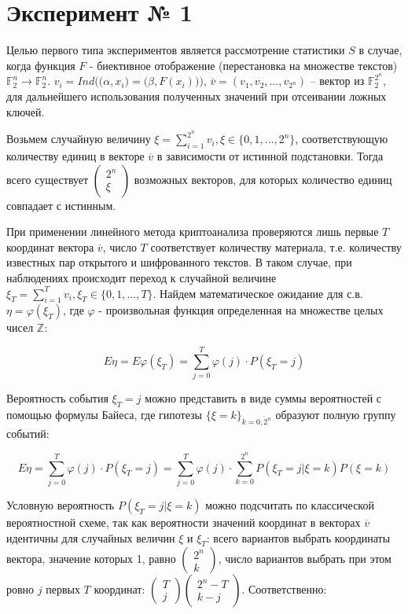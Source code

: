 \documentclass[utf8x, 14pt]{G7-32} %
\begin{document}
\section{Эксперимент № 1}
Целью первого типа экспериментов является рассмотрение статистики $S$ в случае, когда функция $F$ - биективное отображение (перестановка на множестве текстов) $\mathbb{F}_2^n \to \mathbb{F}_2^n$. $v_i = Ind\Big(\big(\alpha, x_i\big) = \big(\beta, F(x_i)\big)\Big)$, $ \overline{v} = (v_1, v_2,..., v_{2^n})$ -- вектор из $\mathbb{F}_2^{2^n}$, для дальнейшего использования полученных значений при отсеивании ложных ключей. 

Возьмем случайную величину $\xi = \sum_{i = 1}^{2^n} v_i, \xi \in \{0, 1,..., 2^n\}$, соответствующую количеству единиц в векторе $\overline{v}$ в зависимости от истинной подстановки. Тогда всего существует $ \left( \begin{aligned} 2^n \\ \xi \end{aligned} \right) $ возможных векторов, для которых количество единиц совпадает с истинным. 

При применении линейного метода криптоанализа проверяются лишь первые $T$ координат вектора $\overline{v}$, число $T$ соответствует количеству материала, т.е. количеству известных пар открытого и шифрованного текстов. В таком случае, при наблюдениях происходит переход к случайной величине $\xi_T = \sum_{i = 1}^{T} v_i, \xi_T \in \{0, 1,..., T\}$. Найдем математическое ожидание для с.в. $\eta = \varphi(\xi_T)$, где $\varphi$ - произвольная функция определенная на множестве целых чисел $\mathbb{Z}$:

$$ E \eta = E \varphi(\xi_T) = \sum_{j=0}^T \varphi(j)\cdot P(\xi_T = j) $$

Вероятность события $\xi_T = j$ можно представить в виде суммы вероятностей с помощью формулы Байеса, где гипотезы $\{\xi = k\}_{k = \overline{0, 2^n}}$ образуют полную группу событий:

$$ E\eta = \sum_{j=0}^T \varphi(j)\cdot P(\xi_T = j) = \sum_{j=0}^T \varphi(j)\cdot \sum_{k = 0}^{2^n} P(\xi_T = j | \xi = k) P(\xi = k)$$

Условную вероятность $P(\xi_T = j | \xi = k)$ можно подсчитать по классической вероятностной схеме, так как вероятности значений координат в векторах $\overline{v}$ идентичны для случайных величин $\xi$ и $\xi_T$: всего вариантов выбрать координаты вектора, значение которых 1, равно $ \left( \begin{aligned} 2^n \\ k \end{aligned} \right) $, число вариантов выбрать при этом ровно $j$ первых $T$ координат: $ \left( \begin{aligned} T \\ j \end{aligned} \right) \left( \begin{aligned} 2^n-T \\ k-j \end{aligned} \right) $. Соответственно:
\end{document}

